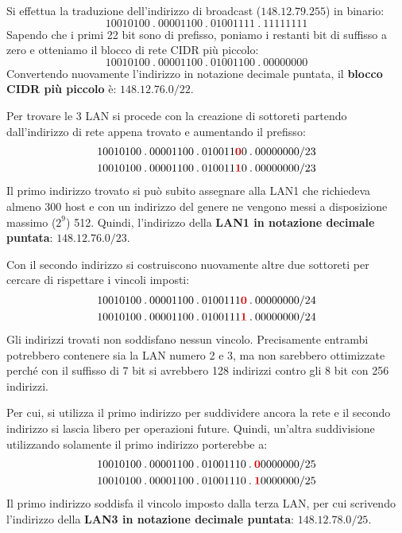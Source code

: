 \documentclass[a4paper]{article}
\newcommand{\binaryaddresspointed}[4]{#1\:.\:#2\:.\:#3\:.\:#4}
\begin{document}
	\noindent
	Si effettua la traduzione dell’indirizzo di broadcast ($148.12.79.255$) in binario:
	\begin{equation*}
		\binaryaddresspointed{10010100}{00001100}{01001111}{11111111}
	\end{equation*}
	Sapendo che i primi 22 bit sono di prefisso, poniamo i restanti bit di suffisso a zero e otteniamo il blocco di rete CIDR più piccolo:
	\begin{equation*}
		\binaryaddresspointed{10010100}{00001100}{01001100}{00000000}
	\end{equation*}
	Convertendo nuovamente l’indirizzo in notazione decimale puntata, il \textbf{blocco CIDR più piccolo} è: $148.12.76.0/22$.\newline
	
	\noindent
	Per trovare le 3 LAN si procede con la creazione di sottoreti partendo dall’indirizzo di rete appena trovato e aumentando il prefisso:
	\begin{gather*}
		\binaryaddresspointed{10010100}{00001100}{010011\textcolor{Red3}{\boldsymbol{0}}0}{00000000}/23 \\
		\binaryaddresspointed{10010100}{00001100}{010011\textcolor{Red3}{\boldsymbol{1}}0}{00000000}/23
	\end{gather*}
	Il primo indirizzo trovato si può subito assegnare alla LAN1 che richiedeva almeno 300 host e con un indirizzo del genere ne vengono messi a disposizione massimo ($2^{9}$) 512. Quindi, l’indirizzo della \textbf{LAN1 in notazione decimale puntata}: $148.12.76.0/23$.\newline
	
	\noindent
	Con il secondo indirizzo si costruiscono nuovamente altre due sottoreti per cercare di rispettare i vincoli imposti:
	\begin{gather*}
		\binaryaddresspointed{10010100}{00001100}{0100111\textcolor{Red3}{\boldsymbol{0}}}{00000000}/24 \\
		\binaryaddresspointed{10010100}{00001100}{0100111\textcolor{Red3}{\boldsymbol{1}}}{00000000}/24
	\end{gather*}
	Gli indirizzi trovati non soddisfano nessun vincolo. Precisamente entrambi potrebbero contenere sia la LAN numero 2 e 3, ma non sarebbero ottimizzate perché con il suffisso di 7 bit si avrebbero 128 indirizzi contro gli 8 bit con 256 indirizzi.\newline
	
	\noindent
	Per cui, si utilizza il primo indirizzo per suddividere ancora la rete e il secondo indirizzo si lascia libero per operazioni future. Quindi, un’altra suddivisione utilizzando solamente il primo indirizzo porterebbe a:
	\begin{gather*}
		\binaryaddresspointed{10010100}{00001100}{01001110}{\textcolor{Red3}{\boldsymbol{0}}0000000}/25 \\
		\binaryaddresspointed{10010100}{00001100}{01001110}{\textcolor{Red3}{\boldsymbol{1}}0000000}/25
	\end{gather*}
	Il primo indirizzo soddisfa il vincolo imposto dalla terza LAN, per cui scrivendo l’indirizzo della \textbf{LAN3 in notazione decimale puntata}: $148.12.78.0/25$.\newline
	
\end{document}

